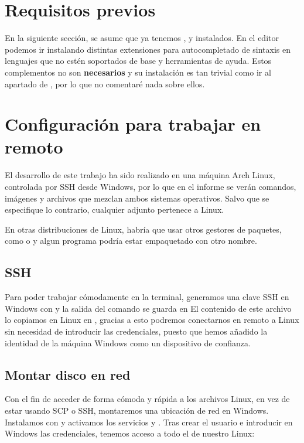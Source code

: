 \section{Requisitos previos}
En la siguiente sección, se asume que ya tenemos ,  y  instalados. En el editor podemos ir instalando distintas extensiones para autocompletado de sintaxis en lenguajes que no estén soportados de base y herramientas de ayuda. Estos complementos no son \textbf{necesarios} y su instalación es tan trivial como ir al apartado de , por lo que no comentaré nada sobre ellos.

\section{Configuración para trabajar en remoto}
El desarrollo de este trabajo ha sido realizado en una máquina Arch Linux, controlada por SSH desde Windows, por lo que en el informe se verán comandos, imágenes y archivos que mezclan ambos sistemas operativos. Salvo que se especifique lo contrario, cualquier adjunto pertenece a Linux. \par
\hr
En otras distribuciones de Linux, habría que usar otros gestores de paquetes, como  o  y algun programa podría estar empaquetado con otro nombre.
\hr

  \subsection{SSH}
  Para poder trabajar cómodamente en la terminal, generamos una clave SSH en Windows con  y la salida del comando se guarda en  \newline
  El contenido de este archivo lo copiamos en Linux en , gracias a esto podremos conectarnos en remoto a Linux sin necesidad de introducir las credenciales, puesto que hemos añadido la identidad de la máquina Windows como un dispositivo de confianza.

  \subsection{Montar disco en red}
  Con el fin de acceder de forma cómoda y rápida a los archivos Linux, en vez de estar usando SCP o SSH, montaremos una ubicación de red en Windows. Instalamos con  y activamos los servicios  y . Tras crear el usuario e introducir en Windows las credenciales, tenemos acceso a todo el  de nuestro Linux:

